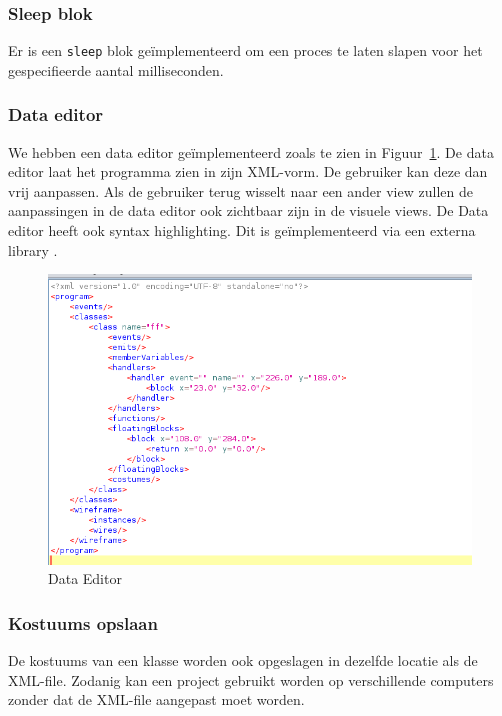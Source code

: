 \documentclass[]{article}
\begin{document}
\subsubsection{Sleep blok}
Er is een \texttt{sleep} blok ge\"implementeerd om een proces te laten slapen voor het gespecifieerde aantal milliseconden.

\subsubsection{Data editor}
We hebben een data editor ge\"implementeerd zoals te zien in Figuur~\ref{editor}. De data editor laat het programma zien in zijn XML-vorm. De gebruiker kan deze dan vrij aanpassen. Als de gebruiker terug wisselt naar een ander view zullen de aanpassingen in de data editor ook zichtbaar zijn in de visuele views. De Data editor heeft ook syntax highlighting. Dit is ge\"implementeerd via een externa library \cite{syntax}.
\begin{figure}[H]
\centering
\includegraphics[width=1.1\textwidth]{./Functionaliteit/editor.png}
\caption{Data Editor}
\label{editor}
\end{figure}

\subsubsection{Kostuums opslaan}
De kostuums van een klasse worden ook opgeslagen in dezelfde locatie als de XML-file. Zodanig kan een project gebruikt worden op verschillende computers zonder dat de XML-file aangepast moet worden.
\end{document}
